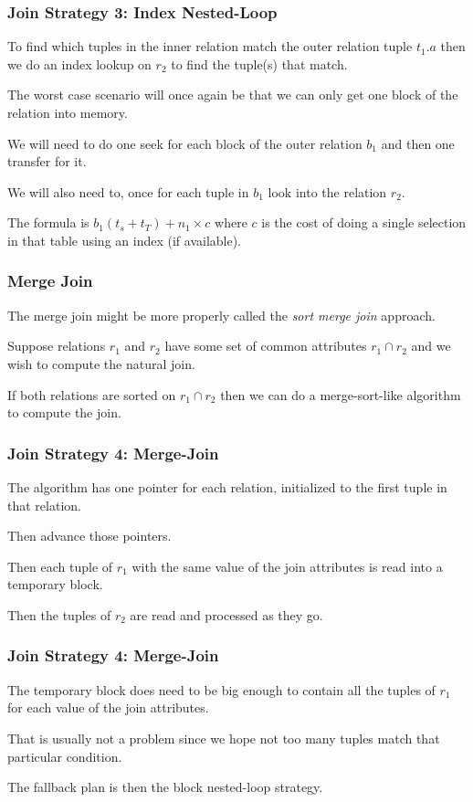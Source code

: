 \begin{frame}
\frametitle{Join Strategy 3: Index Nested-Loop}

To find which tuples in the inner relation match the outer relation tuple $t_{1}.a$ then we do an index lookup on $r_{2}$ to find the tuple(s) that match. 

The worst case scenario will once again be that we can only get one block of the relation into memory. 

We will need to do one seek for each block of the outer relation $b_{1}$ and then one transfer for it. 

We will also need to, once for each tuple in $b_{1}$ look into the relation $r_{2}$. 

The formula is $b_{1} ( t_{s} + t_{T} ) + n_{1} \times c$  where $c$ is the cost of doing a single selection in that table using an index (if available).

\end{frame}

\begin{frame}
\frametitle{Merge Join}

The merge join might be more properly called the \textit{sort merge join} approach. 

Suppose relations $r_{1}$ and $r_{2}$ have some set of common attributes $r_{1} \cap r_{2}$ and we wish to compute the natural join. 

If both relations are sorted on  $r_{1} \cap r_{2}$ then we can do a merge-sort-like algorithm to compute the join.

\end{frame}


\begin{frame}
\frametitle{Join Strategy 4: Merge-Join}

The algorithm has one pointer for each relation, initialized to the first tuple in that relation. 

Then advance those pointers. 

Then each tuple of $r_{1}$ with the same value of the join attributes is read into a temporary block. 

Then the tuples of $r_{2}$ are read and processed as they go.

\end{frame}


\begin{frame}
\frametitle{Join Strategy 4: Merge-Join}

The temporary block does need to be big enough to contain all the tuples of $r_{1}$ for each value of the join attributes. 

That is usually not a problem since we hope not too many tuples match that particular condition. 


The fallback plan is then the block nested-loop strategy.


\end{frame}


